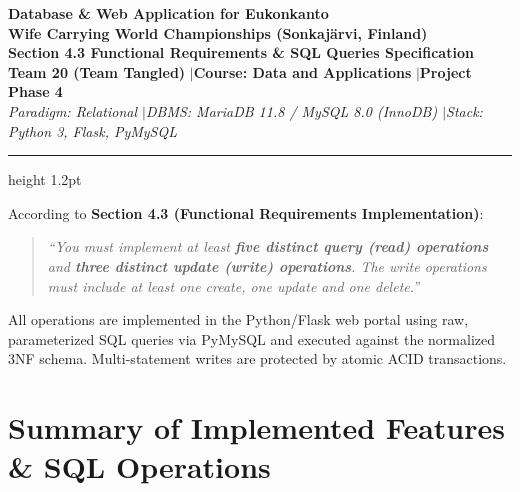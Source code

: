 \documentclass[11pt,a4paper]{article}
\begin{document}
\begin{center}
  {\LARGE \textbf{Database \& Web Application for Eukonkanto}}\\[0.2em]
  {\Large \textbf{Wife Carrying World Championships (Sonkajärvi, Finland)}}\\[0.4em]
  {\large \textbf{Section 4.3 Functional Requirements \& SQL Queries Specification}}\\[0.6em]
  \textbf{Team 20 (Team Tangled)} \quad$\vert$\quad \textbf{Course: Data and Applications} \quad$\vert$\quad \textbf{Project Phase 4}\\[0.3em]
  \textit{Paradigm: Relational \quad$\vert$\quad DBMS: MariaDB 11.8 / MySQL 8.0 (InnoDB) \quad$\vert$\quad Stack: Python 3, Flask, PyMySQL}
\end{center}

\vspace{0.2em}
\hrule height 1.2pt
\vspace{0.5em}

\begin{tcolorbox}[colback=blue!3!white, colframe=brandnavy, title=\textbf{Specification 4.3 Requirement Compliance}, fonttitle=\bfseries]
According to \textbf{Section 4.3 (Functional Requirements Implementation)}:
\begin{quote}
\textit{“You must implement at least \textbf{five distinct query (read) operations} and \textbf{three distinct update (write) operations}. The write operations must include at least one create, one update and one delete.”}
\end{quote}
All operations are implemented in the Python/Flask web portal using raw, parameterized SQL queries via PyMySQL and executed against the normalized 3NF schema. Multi-statement writes are protected by atomic ACID transactions.
\end{tcolorbox}

\vspace{0.2em}

\section{Summary of Implemented Features \& SQL Operations}
\end{document}
